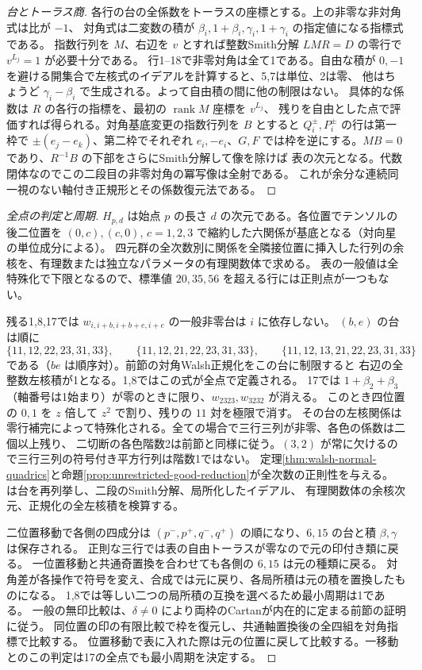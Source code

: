 \begin{proof}[台とトーラス商]
各行の台の全係数をトーラスの座標とする。上の非零な非対角式は比が $-1$、
対角式は二変数の積が $\beta_i,1+\beta_i,\gamma_i,1+\gamma_i$ の指定値になる指標式である。
指数行列を $M$、右辺を $v$ とすれば整数Smith分解 $LMR=D$ の零行で $v^{L_j}=1$ が必要十分である。
行1--18で非零対角は全て1である。自由な積が $0,-1$ を避ける開集合で左核式のイデアルを計算すると、5,7は単位、2は零、
他はちょうど $\gamma_i-\beta_i$ で生成される。よって自由積の間に他の制限はない。
具体的な係数は $R$ の各行の指標を、最初の $\operatorname{rank}M$ 座標を $v^{L_j}$、
残りを自由とした点で評価すれば得られる。対角基底変更の指数行列を $B$ とすると
$Q_i^\pm,P_i^\pm$ の行は第一枠で $\pm(e_j-e_k)$、第二枠でそれぞれ
$e_i,-e_i$、$G,F$ では枠を逆にする。$MB=0$ であり、$R^{-1}B$ の下部をさらにSmith分解して像を除けば
表の次元となる。代数閉体なのでこの二段目の非零対角の冪写像は全射である。
これが余分な連続同一視のない軸付き正規形とその係数復元法である。
\end{proof}

\begin{proof}[全点の判定と周期]
$H_{p,d}$ は始点 $p$ の長さ $d$ の次元である。各位置でテンソルの後二位置を
$(0,c),(c,0)$, $c=1,2,3$ で縮約した六関係が基底となる（対向星の単位成分による）。
四元群の全次数別に関係を全隣接位置に挿入した行列の余核を、有理数または独立なパラメータの有理関数体で求める。
表の一般値は全特殊化で下限となるので、標準値 $20,35,56$ を超える行には正則点が一つもない。

残る1,8,17では $w_{i,i+b,i+b+e,i+e}$ の一般非零台は $i$ に依存しない。
$(b,e)$ の台は順に
\[
 \{11,12,22,23,31,33\},\qquad
 \{11,12,21,22,23,31,33\},\qquad
 \{11,12,13,21,22,23,31,33\}
\]
である（$be$ は順序対）。前節の対角Walsh正規化をこの台に制限すると
右辺の全整数左核積が1となる。1,8ではこの式が全点で定義される。
17では $1+\beta_2+\beta_3$（軸番号は1始まり）が零のときに限り、$w_{2323},w_{3232}$ が消える。
このとき四位置の $0,1$ を $z$ 倍して $z^2$ で割り、残りの $11$ 対を極限で消す。
その台の左核関係は零行補完によって特殊化される。全ての場合で三行三列が非零、各色の係数は二個以上残り、
二切断の各色階数2は前節と同様に従う。$(3,2)$ が常に欠けるので三行三列の符号付き平方行列は階数1ではない。
定理\ref{thm:walsh-normal-quadrics}と命題\ref{prop:unrestricted-good-reduction}が全次数の正則性を与える。
 は台を再列挙し、二段のSmith分解、局所化したイデアル、
有理関数体の余核次元、正規化の全左核積を検算する。

二位置移動で各側の四成分は $(p^-,p^+,q^-,q^+)$ の順になり、$6,15$ の台と積 $\beta,\gamma$ は保存される。
正則な三行では表の自由トーラスが零なので元の印付き類に戻る。
一位置移動と共通奇置換を合わせても各側の $6,15$ は元の種類に戻る。
対角差が各操作で符号を変え、合成では元に戻り、各局所積は元の積を置換したものになる。
1,8では等しい二つの局所積の互換を選べるため最小周期は1である。
一般の無印比較は、$\delta\ne0$ により両枠のCartanが内在的に定まる前節の証明に従う。
同位置の印の有限比較で枠を復元し、共通軸置換後の全四組を対角指標で比較する。
位置移動で表に入れた際は元の位置に戻して比較する。一移動とのこの判定は17の全点でも最小周期を決定する。
\end{proof}
